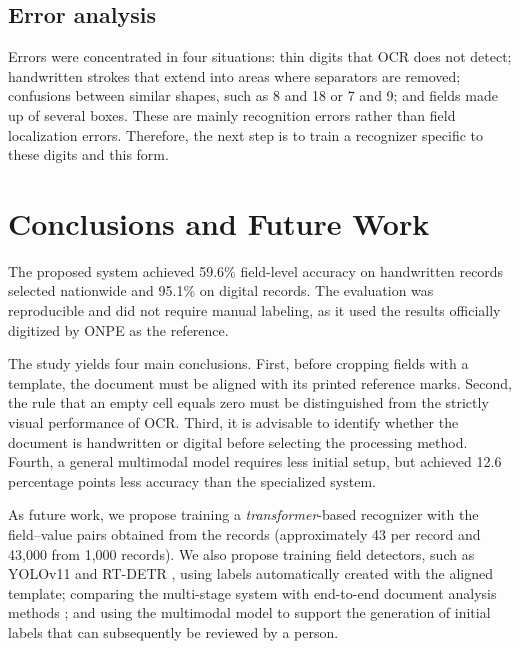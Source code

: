 \documentclass[conference]{IEEEtran}
\begin{document}
\subsection{Error analysis}
Errors were concentrated in four situations: thin digits that OCR does not
detect; handwritten strokes that extend into areas where separators are removed;
confusions between similar shapes, such as 8 and 18 or 7 and 9; and fields made
up of several boxes. These are mainly recognition errors rather than field
localization errors. Therefore, the next step is to train a recognizer specific
to these digits and this form.

\section{Conclusions and Future Work}
The proposed system achieved 59.6\% field-level accuracy on handwritten records
selected nationwide and 95.1\% on digital records. The evaluation was
reproducible and did not require manual labeling, as it used the results
officially digitized by ONPE as the reference.

The study yields four main conclusions. First, before cropping fields with a
template, the document must be aligned with its printed reference marks. Second,
the rule that an empty cell equals zero must be distinguished from the strictly
visual performance of OCR. Third, it is advisable to identify whether the
document is handwritten or digital before selecting the processing method.
Fourth, a general multimodal model requires less initial setup, but achieved
12.6 percentage points less accuracy than the specialized system.

As future work, we propose training a \emph{transformer}-based recognizer with
the field--value pairs obtained from the records (approximately 43 per record
and 43,000 from 1,000 records). We also propose training field detectors, such
as YOLOv11 and RT-DETR \cite{rtdetr}, using labels automatically created with
the aligned template; comparing the multi-stage system with end-to-end document
analysis methods \cite{omniparser,donut}; and using the multimodal model to
support the generation of initial labels that can subsequently be reviewed by a
person.
\end{document}
